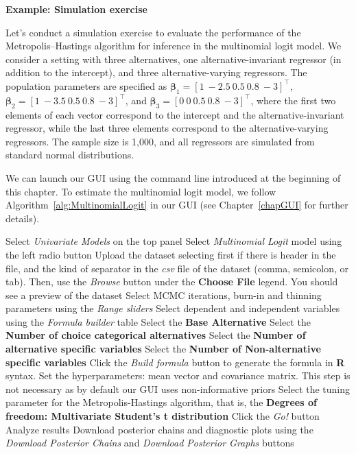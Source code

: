 \textbf{Example: Simulation exercise}

Let's conduct a simulation exercise to evaluate the performance of the Metropolis–Hastings algorithm for inference in the multinomial logit model. We consider a setting with three alternatives, one alternative-invariant regressor (in addition to the intercept), and three alternative-varying regressors. The population parameters are specified as $\bm{\beta}_1 = [1 \ -2.5 \ 0.5 \ 0.8 \ -3]^{\top}$, $\bm{\beta}_2 = [1 \ -3.5 \ 0.5 \ 0.8 \ -3]^{\top}$, and $\bm{\beta}_3 = [0 \ 0 \ 0.5 \ 0.8 \ -3]^{\top}$, where the first two elements of each vector correspond to the intercept and the alternative-invariant regressor, while the last three elements correspond to the alternative-varying regressors. The sample size is 1,000, and all regressors are simulated from standard normal distributions.

We can launch our GUI using the command line introduced at the beginning of this chapter. To estimate the multinomial logit model, we follow Algorithm~\ref{alg:MultinomialLogit} in our GUI (see Chapter~\ref{chapGUI} for further details).

\begin{algorithm}[h!]
	\caption{Multinomial logit models}\label{alg:MultinomialLogit}
	\begin{algorithmic}[1]  		 			
		\State Select \textit{Univariate Models} on the top panel
		\State Select \textit{Multinomial Logit} model using the left radio button
		\State Upload the dataset selecting first if there is header in the file, and the kind of separator in the \textit{csv} file of the dataset (comma, semicolon, or tab). Then, use the \textit{Browse} button under the \textbf{Choose File} legend. You should see a preview of the dataset
		\State Select MCMC iterations, burn-in and thinning parameters using the \textit{Range sliders}
		\State Select dependent and independent variables using the \textit{Formula builder} table
		\State Select the \textbf{Base Alternative}
		\State Select the \textbf{Number of choice categorical alternatives}
		\State Select the \textbf{Number of alternative specific variables}
		\State Select the \textbf{Number of Non-alternative specific variables} 
		\State Click the \textit{Build formula} button to generate the formula in \textbf{R} syntax.
		\State Set the hyperparameters: mean vector and covariance matrix. This step is not necessary as by default our GUI uses non-informative priors
		\State Select the tuning parameter for the Metropolis-Hastings algorithm, that is, the \textbf{Degrees of freedom: Multivariate Student's t distribution} 
		\State Click the \textit{Go!} button
		\State Analyze results
		\State Download posterior chains and diagnostic plots using the \textit{Download Posterior Chains} and \textit{Download Posterior Graphs} buttons
	\end{algorithmic} 
\end{algorithm}

